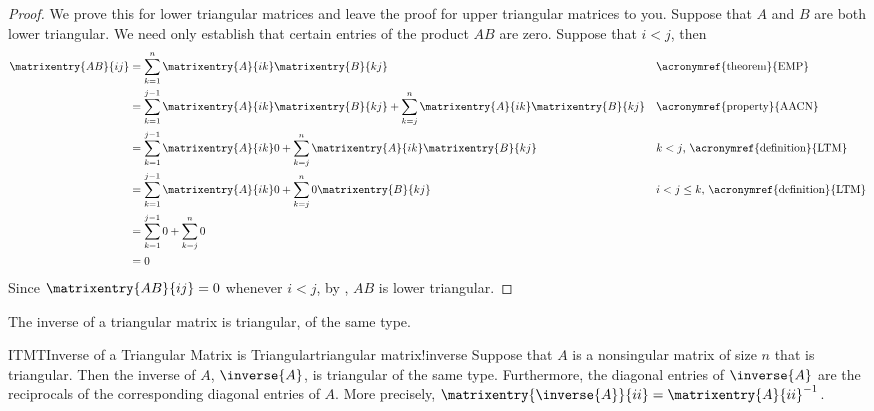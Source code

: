 %
\begin{proof}
We prove this for lower triangular matrices and leave the proof for upper triangular matrices to you.  Suppose that $A$ and $B$ are both lower triangular.  We need only establish that certain entries of the product $AB$ are zero.  Suppose that $i<j$, then
%
\begin{align*}
\matrixentry{AB}{ij}
&=
\sum_{k=1}^{n}\matrixentry{A}{ik}\matrixentry{B}{kj}
&&\text{\acronymref{theorem}{EMP}}\\
&=
\sum_{k=1}^{j-1}\matrixentry{A}{ik}\matrixentry{B}{kj}
+
\sum_{k=j}^{n}\matrixentry{A}{ik}\matrixentry{B}{kj}
&&\text{\acronymref{property}{AACN}}\\
&=
\sum_{k=1}^{j-1}\matrixentry{A}{ik}0
+
\sum_{k=j}^{n}\matrixentry{A}{ik}\matrixentry{B}{kj}
&&\text{$k<j$, \acronymref{definition}{LTM}}\\
&=
\sum_{k=1}^{j-1}\matrixentry{A}{ik}0
+
\sum_{k=j}^{n}0\matrixentry{B}{kj}
&&\text{$i<j\leq k$, \acronymref{definition}{LTM}}\\
&=
\sum_{k=1}^{j-1}0+\sum_{k=j}^{n}0\\
&=
0
\end{align*}
%
Since $\matrixentry{AB}{ij}=0$ whenever $i<j$, by , $AB$ is lower triangular.
%
\end{proof}
%
The inverse of a triangular matrix is triangular, of the same type.
%
\begin{theorem}{ITMT}{Inverse of a Triangular Matrix is Triangular}{triangular matrix!inverse}
Suppose that $A$ is a nonsingular matrix of size $n$ that is triangular.  Then the inverse of $A$, $\inverse{A}$, is triangular of the same type.  Furthermore, the diagonal entries of $\inverse{A}$ are the reciprocals of the corresponding diagonal entries of $A$.  More precisely, $\matrixentry{\inverse{A}}{ii}=\matrixentry{A}{ii}^{-1}$.
\end{theorem}
%
